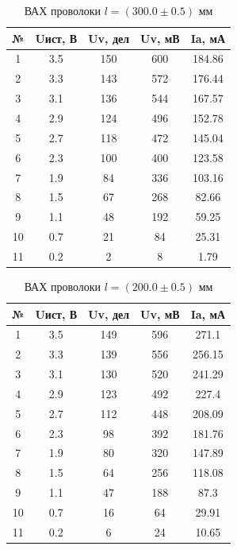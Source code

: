\documentclass{article}
\begin{document}
	\begin{table}[H]
		\centering
		\begin{tabular}{|c|c|c|c|c|}
			\hline
			№ & Uист, В & Uv, дел & Uv, мВ & Ia, мА \\ \hline
			1 & 3.5 & 150 & 600 & 184.86 \\ \hline
			2 & 3.3 & 143 & 572 & 176.44 \\ \hline
			3 & 3.1 & 136 & 544 & 167.57 \\ \hline
			4 & 2.9 & 124 & 496 & 152.78 \\ \hline
			5 & 2.7 & 118 & 472 & 145.04 \\ \hline
			6 & 2.3 & 100 & 400 & 123.58 \\ \hline
			7 & 1.9 & 84 & 336 & 103.16 \\ \hline
			8 & 1.5 & 67 & 268 & 82.66 \\ \hline
			9 & 1.1 & 48 & 192 & 59.25 \\ \hline
			10 & 0.7 & 21 & 84 & 25.31 \\ \hline
			11 & 0.2 & 2 & 8 & 1.79 \\ \hline
		\end{tabular}
		\caption{ВАХ проволоки $l = (300.0 \pm 0.5)$ мм}
	\end{table}
	
	\begin{table}[H]
		\centering
		\begin{tabular}{|c|c|c|c|c|}
			\hline
			№ & Uист, В & Uv, дел & Uv, мВ & Ia, мА \\ \hline
			1 & 3.5 & 149 & 596 & 271.1 \\ \hline
			2 & 3.3 & 139 & 556 & 256.15 \\ \hline
			3 & 3.1 & 130 & 520 & 241.29 \\ \hline
			4 & 2.9 & 123 & 492 & 227.4 \\ \hline
			5 & 2.7 & 112 & 448 & 208.09 \\ \hline
			6 & 2.3 & 98 & 392 & 181.76 \\ \hline
			7 & 1.9 & 80 & 320 & 147.89 \\ \hline
			8 & 1.5 & 64 & 256 & 118.08 \\ \hline
			9 & 1.1 & 47 & 188 & 87.3 \\ \hline
			10 & 0.7 & 16 & 64 & 29.91 \\ \hline
			11 & 0.2 & 6 & 24 & 10.65 \\ \hline
		\end{tabular}
		\caption{ВАХ проволоки $l = (200.0 \pm 0.5)$ мм}
	\end{table}
	
\end{document}
